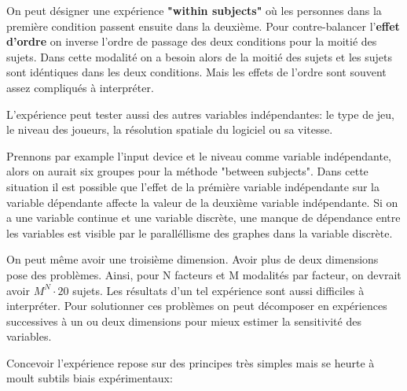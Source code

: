 On peut d\'esigner une exp\'erience \textbf{"within subjects"} o\`u les personnes dans la premi\`ere condition passent ensuite dans la deuxi\`eme. Pour contre-balancer l'\textbf{effet d'ordre} on inverse l'ordre de passage des deux conditions pour la moiti\'e des sujets. Dans cette modalit\'e on a besoin alors de la moiti\'e des sujets et les sujets sont id\'entiques dans les deux conditions. Mais les effets de l'ordre sont souvent assez compliqu\'es \`a interpr\'eter. 

L'exp\'erience peut tester aussi des autres variables ind\'ependantes: le type de jeu, le niveau des joueurs, la r\'esolution spatiale du logiciel ou sa vitesse. 

Prennons par example l'input device et le niveau comme variable ind\'ependante, alors on aurait six groupes pour la m\'ethode "between subjects". Dans cette situation il est possible que l'effet de la pr\'emi\`ere variable ind\'ependante sur la variable d\'ependante affecte la valeur de la deuxi\`eme variable ind\'ependante. Si on a une variable continue et une variable discr\`ete, une manque de d\'ependance entre les variables est visible par le parall\'ellisme des graphes dans la variable discr\`ete. 

On peut m\^eme avoir une troisi\`eme dimension. Avoir plus de deux dimensions pose des probl\`emes. Ainsi, pour N facteurs et M modalit\'es par facteur, on devrait avoir \textbf{$M^N \cdot 20$} sujets. Les r\'esultats d'un tel exp\'erience sont aussi difficiles \`a interpr\'eter. Pour solutionner ces probl\`emes on peut d\'ecomposer en exp\'eriences successives \`a un ou deux dimensions pour mieux estimer la sensitivit\'e des variables.

Concevoir l'exp\'erience repose sur des principes tr\`es simples mais se heurte \`a moult subtils biais exp\'erimentaux:

